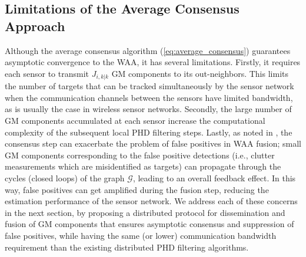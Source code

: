 
\subsection{Limitations of the Average Consensus Approach}
Although the average consensus algorithm (\ref{eq:average_consensus}) guarantees asymptotic convergence to the WAA, it has several limitations. Firstly, it requires each sensor to transmit $J_{i,k|k}$ GM components to its out-neighbors. This limits the number of targets that can be tracked simultaneously by the sensor network when the communication channels between the sensors have limited bandwidth, as is usually the case in wireless sensor networks. Secondly, the large number of GM components accumulated at each sensor increase the computational complexity of the subsequent local PHD filtering steps. Lastly, as noted in \cite{li2018partial}, the consensus step can exacerbate the problem of false positives in WAA fusion; small GM components corresponding to the false positive detections (i.e., clutter measurements which are misidentified as targets) can propagate through the cycles (closed loops) of the graph $\mathcal G$, leading to an overall feedback effect. In this way, false positives can get amplified during the fusion step, reducing the estimation performance of the sensor network. We address each of these concerns in the next section, by proposing a distributed protocol for dissemination and fusion of GM components that ensures asymptotic consensus and suppression of false positives, while having the same (or lower) communication bandwidth requirement than the existing distributed PHD filtering algorithms.